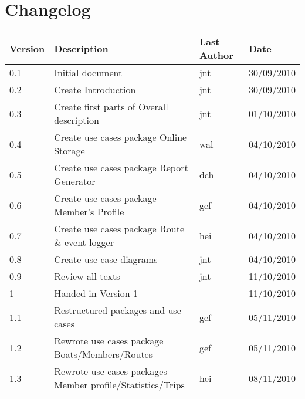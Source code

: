 \section*{Changelog}

\begin{table}[h!]
	\begin{center}
		\begin{tabular}{|l|l|l|l|}
			\hline
			\rowcolor{fontys_pink_light}Version	&Description	&Last Author	&Date\\
			\hline
			0.1	&Initial document	&jnt	&30/09/2010\\
			\hline
			0.2	&Create Introduction	&jnt	&30/09/2010\\
			\hline
			0.3	&Create first parts of Overall description	&jnt	&01/10/2010\\
			\hline
			0.4	&Create use cases package Online Storage&wal	&04/10/2010\\
			\hline
			0.5	&Create use cases package Report Generator	&dch	&04/10/2010\\
			\hline
			0.6	&Create use cases package Member's Profile	&gef	&04/10/2010\\
			\hline
			0.7	&Create use cases package Route \& event logger	&hei	&04/10/2010\\
			\hline
			0.8	&Create use case diagrams	&jnt	&04/10/2010\\
			\hline
			0.9	&Review all texts	&jnt	&11/10/2010\\
			\hline
			\rowcolor{fontysgreen2}1	& Handed in Version 1 & &11/10/2010\\
			\hline
			1.1	&Restructured packages and use cases	&gef	&05/11/2010\\
			\hline
			1.2	&Rewrote use cases package Boats/Members/Routes	&gef	&05/11/2010\\
			\hline
			1.3	&Rewrote use cases packages Member profile/Statistics/Trips 	&hei	&08/11/2010\\

		\hline
		\end{tabular}
	\end{center}
	\label{tab:changelog}
\end{table}
